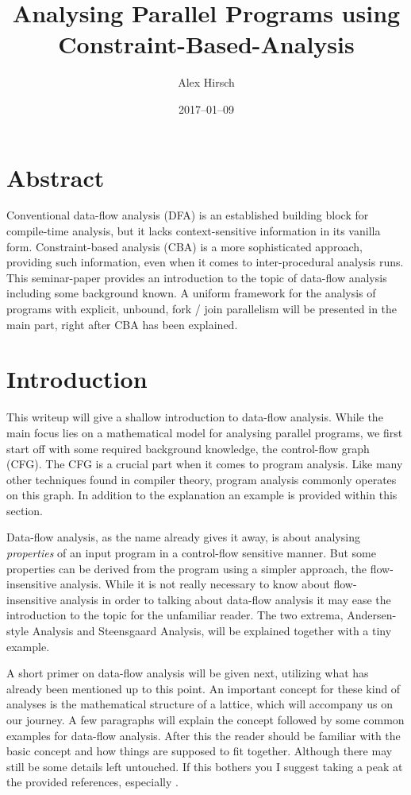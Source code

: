 \documentclass[article]{uibk}
\title{Analysing Parallel Programs using Constraint-Based-Analysis}
\author{Alex Hirsch}
\date{2017--01--09}
\begin{document}
\maketitle

\section*{Abstract}
\label{sec:abstract}

Conventional data-flow analysis (DFA) is an established building block for
compile-time analysis, but it lacks context-sensitive information in its
vanilla form. Constraint-based analysis (CBA) is a more sophisticated approach,
providing such information, even when it comes to inter-procedural analysis
runs. This seminar-paper provides an introduction to the topic of data-flow
analysis including some background known. A uniform framework for the analysis
of programs with explicit, unbound, fork / join parallelism will be presented
in the main part, right after CBA has been explained.

\tableofcontents

\newpage

\section{Introduction}

This writeup will give a shallow introduction to data-flow analysis. While the
main focus lies on a mathematical model for analysing parallel programs, we
first start off with some required background knowledge, the control-flow graph
(CFG). The CFG is a crucial part when it comes to program analysis. Like many
other techniques found in compiler theory, program analysis commonly operates
on this graph. In addition to the explanation an example is provided within
this section.

Data-flow analysis, as the name already gives it away, is about analysing
\textit{properties} of an input program in a control-flow sensitive manner. But
some properties can be derived from the program using a simpler approach, the
flow-insensitive analysis. While it is not really necessary to know about
flow-insensitive analysis in order to talking about data-flow analysis it may
ease the introduction to the topic for the unfamiliar reader. The two extrema,
Andersen-style Analysis and Steensgaard Analysis, will be explained together
with a tiny example.

A short primer on data-flow analysis will be given next, utilizing what has
already been mentioned up to this point. An important concept for these kind of
analyses is the mathematical structure of a lattice, which will accompany us on
our journey. A few paragraphs will explain the concept followed by some common
examples for data-flow analysis. After this the reader should be familiar with
the basic concept and how things are supposed to fit together. Although there
may still be some details left untouched. If this bothers you I suggest taking
a peak at the provided references, especially \cite{Nielson:ppa}.
\end{document}
